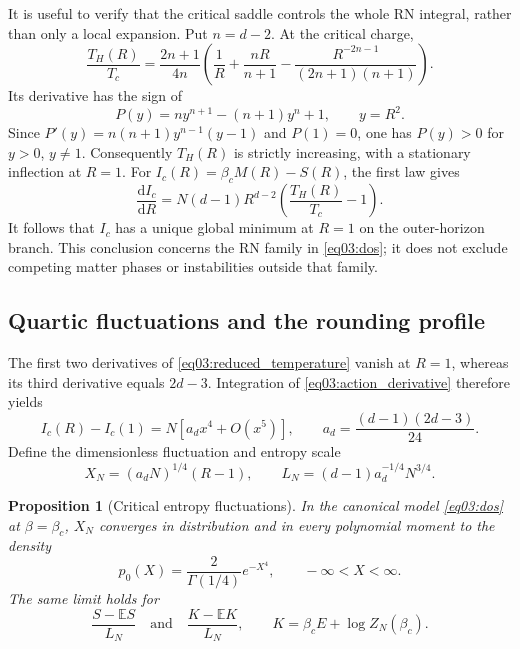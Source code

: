 \documentclass[11pt,letterpaper]{article}
\newcommand{\E}{\mathbb{E}}
\newcommand{\dd}{\mathrm{d}}
\theoremstyle{plain}
\newtheorem{proposition}[theorem]{Proposition}
\theoremstyle{definition}
\theoremstyle{remark}
\begin{document}
It is useful to verify that the critical saddle controls the whole
RN integral, rather than only a local expansion.  Put $n=d-2$.  At
the critical charge,
\begin{equation}
 \frac{T_H(R)}{T_c}
 =\frac{2n+1}{4n}
 \left(\frac{1}{R}+\frac{nR}{n+1}
       -\frac{R^{-2n-1}}{(2n+1)(n+1)}\right).
 \label{eq03:reduced_temperature}
\end{equation}
Its derivative has the sign of
\begin{equation}
 P(y)=n y^{n+1}-(n+1)y^n+1,\qquad y=R^2.
 \label{eq03:monotonic_polynomial}
\end{equation}
Since $P'(y)=n(n+1)y^{n-1}(y-1)$ and $P(1)=0$, one has
$P(y)>0$ for $y>0$, $y\neq1$.  Consequently $T_H(R)$ is strictly
increasing, with a stationary inflection at $R=1$.  For
$I_c(R)=\beta_c M(R)-S(R)$, the first law gives
\begin{equation}
 \frac{\dd I_c}{\dd R}
   =N(d-1)R^{d-2}\left(\frac{T_H(R)}{T_c}-1\right).
 \label{eq03:action_derivative}
\end{equation}
It follows that $I_c$ has a unique global minimum at $R=1$ on the
outer-horizon branch.  This conclusion concerns the RN family in
\eqref{eq03:dos}; it does not exclude competing matter phases or
instabilities outside that family.

\subsection{Quartic fluctuations and the rounding profile}

The first two derivatives of \eqref{eq03:reduced_temperature} vanish
at $R=1$, whereas its third derivative equals $2d-3$.  Integration
of \eqref{eq03:action_derivative} therefore yields
\begin{equation}
 I_c(R)-I_c(1)
 =N\left[a_d x^4+O(x^5)\right],\qquad
 a_d=\frac{(d-1)(2d-3)}{24}.
 \label{eq03:quartic_action}
\end{equation}
Define the dimensionless fluctuation and entropy scale
\begin{equation}
 X_N=(a_dN)^{1/4}(R-1),\qquad
 L_N=(d-1)a_d^{-1/4}N^{3/4}.
 \label{eq03:scales}
\end{equation}

\begin{proposition}[Critical entropy fluctuations]
\label{prop03:quartic}
In the canonical model \eqref{eq03:dos} at $\beta=\beta_c$,
$X_N$ converges in distribution and in every polynomial moment to
the density
\begin{equation}
 p_0(X)=\frac{2}{\Gamma(1/4)}e^{-X^4},
 \qquad -\infty<X<\infty.
 \label{eq03:quartic_density}
\end{equation}
The same limit holds for
\begin{equation}
 \frac{S-\E S}{L_N}
 \quad\text{and}\quad
 \frac{K-\E K}{L_N},
 \qquad K=\beta_c E+\log Z_N(\beta_c).
 \label{eq03:entropy_limit}
\end{equation}
\end{proposition}
\end{document}
